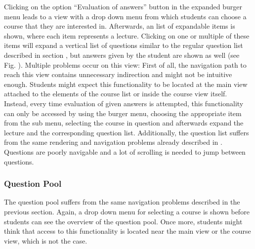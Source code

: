 Clicking on the option “Evaluation of answers” button in the expanded burger menu leads to a view with a drop down menu from which students can choose a course that they are interested in. Afterwards, an list of expandable items is shown, where each item represents a lecture. Clicking on one or multiple of these items will expand a vertical list of questions similar to  the regular question list described in section \todosct, but answers given by the student are shown as well (see Fig. \todosct).
Multiple problems occur on this view: First of all, the navigation path to reach this view contains unnecessary indirection and might not be intuitive enough. Students might expect this functionality to be located at the main view attached to the elements of the course list or inside the course view itself. Instead, every time evaluation of given answers is attempted, this functionality can only be accessed by using the burger menu, choosing the appropriate item from the sub menu, selecting the course in question and afterwards expand the lecture and the corresponding question list.
Additionally, the question list suffers from the same rendering and navigation problems already described in \todosct. Questions are poorly navigable and a lot of scrolling is needed to jump between questions.

\subsubsection{Question Pool}

The question pool suffers from the same navigation problems described in the previous section. Again, a drop down menu for selecting a course is shown before students can see the overview of the question pool. Once more, students might think that access to this functionality is located near the main view or the course view, which is not the case.


